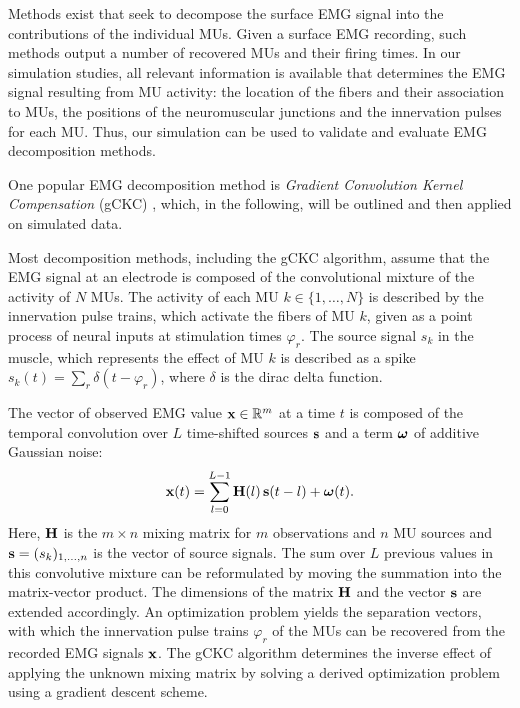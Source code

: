 Methods exist that seek to decompose the surface EMG signal into the contributions of the individual MUs. Given a surface EMG recording, such methods output a number of recovered MUs and their firing times.
In our simulation studies, all relevant information is available that determines the EMG signal resulting from MU activity: the location of the fibers and their association to MUs, the positions of the neuromuscular junctions and the innervation pulses for each MU.
Thus, our simulation can be used to validate and evaluate EMG decomposition methods.

One popular EMG decomposition method is \emph{Gradient Convolution Kernel Compensation} (gCKC) \cite{Holobar2007b,Holobar2007}, which, in the following, will be outlined and then applied on simulated data.

Most decomposition methods, including the gCKC algorithm, assume that the EMG signal at an electrode is composed of the convolutional mixture of the activity of $N$ MUs.
The activity of each MU $k\in \{1,\dots,N\}$ is described by the innervation pulse trains, which activate the fibers of MU $k$, given as a point process of neural inputs at stimulation times $\varphi_r$. The source signal $s_k$ in the muscle, which represents the effect of MU $k$ is described as a spike $s_k(t) = \sum_r\delta(t - \varphi_r)$, where $\delta$ is the dirac delta function.

The vector of observed EMG value $\textbf{x} \in \mathbb{R}^m$ at a time $t$ is composed of the temporal convolution over $L$ time-shifted sources $\textbf{s}$ and a term $\boldsymbol{\omega}$ of additive Gaussian noise:
\begin{align*}
  \textbf{x}(t) = \displaystyle\sum\limits_{l=0}^{L-1}\textbf{H}(l)\,\textbf{s}(t-l) + \boldsymbol{\omega}(t).
\end{align*}
Here, $\textbf{H}$ is the $m\times n$ mixing matrix for $m$ observations and $n$ MU sources and $\textbf{s} = (s_k)_{1,\dots,n}$ is the vector of source signals. The sum over $L$ previous values in this convolutive mixture can be reformulated by moving the summation into the matrix-vector product. The dimensions of the matrix $\textbf{H}$ and the vector $\textbf{s}$ are extended accordingly. 
An optimization problem yields the separation vectors, with which the innervation pulse trains $\varphi_r$ of the MUs can be recovered from the recorded EMG signals $\textbf{x}$. The gCKC algorithm determines the inverse effect of applying the unknown mixing matrix by solving a derived optimization problem using a gradient descent scheme.

